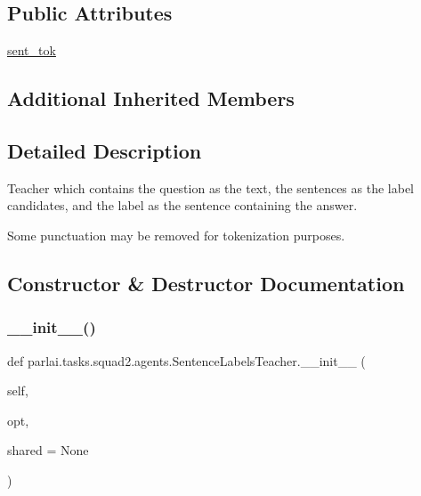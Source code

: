\subsection*{Public Attributes}
\begin{DoxyCompactItemize}
\item 
\hyperlink{classparlai_1_1tasks_1_1squad2_1_1agents_1_1SentenceLabelsTeacher_a38eaa848e9051e5fb1b0a63f2308481e}{sent\+\_\+tok}
\end{DoxyCompactItemize}
\subsection*{Additional Inherited Members}


\subsection{Detailed Description}
\begin{DoxyVerb}Teacher which contains the question as the text, the sentences as the label
candidates, and the label as the sentence containing the answer.

Some punctuation may be removed for tokenization purposes.
\end{DoxyVerb}
 

\subsection{Constructor \& Destructor Documentation}
\mbox{\label{classparlai_1_1tasks_1_1squad2_1_1agents_1_1SentenceLabelsTeacher_acc15b4caefa5b72697761981c39873dc}} 
\subsubsection{\texorpdfstring{\+\_\+\+\_\+init\+\_\+\+\_\+()}{\_\_init\_\_()}}
{\footnotesize\ttfamily def parlai.\+tasks.\+squad2.\+agents.\+Sentence\+Labels\+Teacher.\+\_\+\+\_\+init\+\_\+\+\_\+ (\begin{DoxyParamCaption}\item[{}]{self,  }\item[{}]{opt,  }\item[{}]{shared = {\ttfamily None} }\end{DoxyParamCaption})}



